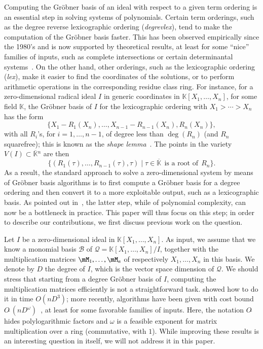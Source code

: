 \documentclass[final,1p,times,authoryear]{elsarticle}
\newcommand{\basis}{\mathscr{B}}
\newcommand{\softO}[1]{O{\tilde{~}}(#1)} %
\newcommand{\residueI}{\mathscr{Q}}
\def\K{\mathbb{K}}
\def\K {\ensuremath{\mathbb{K}}}
\def\Kbar {{\ensuremath{\overline{\mathbb{K}}}}}
\begin{document}
Computing the Gr\"obner basis of an ideal with respect to a given term
ordering is an essential step in solving systems of polynomials.
Certain term orderings, such as the degree reverse lexicographic
ordering (\textit{degrevlex}), tend to make the computation of the
Gr\"obner basis faster. This has been observed empirically since the
1980's and is now supported by theoretical results, at least for some
``nice'' families of inputs, such as complete intersections or certain
determinantal systems~\citep{Faugere02,FaSaSp13,BaFaSa15}.  On the
other hand, other orderings, such as the lexicographic ordering
(\textit{lex}), make it easier to find the coordinates of the
solutions, or to perform arithmetic operations in the corresponding
residue class ring.  For instance, for a zero-dimensional radical
ideal $I$ in generic coordinates in $\K[X_1,\dots,X_n]$, for some
field $\K$, the Gr\"obner basis of $I$ for the lexicographic ordering
with $X_1 > \cdots > X_n$ has the form
\begin{equation}\label{eq:shapelemma}
  \{ X_1 - R_1(X_n),\dots,X_{n-1}-R_{n-1}(X_n),R_n(X_n)\},
\end{equation}
with all $R_i$'s, for $i =1,\dots,n-1$, of degree less than
$\deg(R_n)$ (and $R_n$ squarefree); this is known as the {\em
shape lemma}~\citep{GiMo89}. The points in the variety $V(I) \subset
\Kbar{}^n$ are then
$$\{ ( R_1(\tau), \dots, R_{n-1}(\tau), \tau ) \mid \tau \in \Kbar
\;\,\text{is a root of}\;\, R_n\}.$$ As a result, the standard approach to
solve a zero-dimensional system by means of Gr\"obner basis
algorithms is to first compute a Gr\"obner basis for a degree ordering
and then convert it to a more exploitable output, such as a lexicographic
basis. As pointed out in~\citep{FaMo17}, the latter step, while of
polynomial complexity, can now be a bottleneck in practice. This
paper will thus focus on this step; in order to describe our 
contributions, we first discuss previous work on the question.

Let $I$ be a zero-dimensional ideal in $\K[X_1,\dots,X_n]$.  As
input, we assume that we know a monomial basis $\basis$ of
$\residueI=\K[X_1,\dots,X_n]/I$, together with the multiplication
matrices $\mM_1,\dots,\mM_n$ of respectively $X_1,\dots,X_n$ in this
basis. We denote by $D$ the degree of $I$, which is the vector space
dimension of $\residueI$. We should stress that starting from a
degree Gr\"obner basis of $I$, computing the multiplication matrices
efficiently is not a straightforward task. \citep{FaGiLaMo93}
showed how to do it in time $O(nD^3)$; more
recently, algorithms have been given with cost bound
$\softO{nD^\omega}$~\citep{FaGaHuRe13,FaGaHuRe14,Neiger16}, at least
for some favorable families of inputs. Here, the notation
$O\tilde{~}$ hides polylogarithmic factors and $\omega$ is a feasible
exponent for matrix multiplication over a ring (commutative, with
$1$). While improving these results is an interesting question in
itself, we will not address it in this paper.
\end{document}
